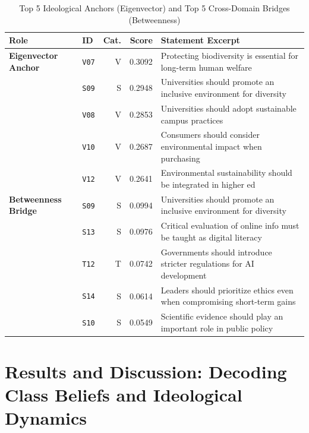 \documentclass[10pt, a4paper]{article}
\begin{document}
\begin{table}[H]
\centering
\small
\caption{Top 5 Ideological Anchors (Eigenvector) and Top 5 Cross-Domain Bridges (Betweenness)}
\label{tab:item_centrality_table}
\begin{tabular}{llrrl}
\toprule
\textbf{Role} & \textbf{ID} & \textbf{Cat.} & \textbf{Score} & \textbf{Statement Excerpt} \\
\midrule
\textbf{Eigenvector Anchor}  & \texttt{V07} & V & 0.3092 & Protecting biodiversity is essential for long-term human welfare \\
                             & \texttt{S09} & S & 0.2948 & Universities should promote an inclusive environment for diversity \\
                             & \texttt{V08} & V & 0.2853 & Universities should adopt sustainable campus practices \\
                             & \texttt{V10} & V & 0.2687 & Consumers should consider environmental impact when purchasing \\
                             & \texttt{V12} & V & 0.2641 & Environmental sustainability should be integrated in higher ed \\
\midrule
\textbf{Betweenness Bridge}  & \texttt{S09} & S & 0.0994 & Universities should promote an inclusive environment for diversity \\
                             & \texttt{S13} & S & 0.0976 & Critical evaluation of online info must be taught as digital literacy \\
                             & \texttt{T12} & T & 0.0742 & Governments should introduce stricter regulations for AI development \\
                             & \texttt{S14} & S & 0.0614 & Leaders should prioritize ethics even when compromising short-term gains \\
                             & \texttt{S10} & S & 0.0549 & Scientific evidence should play an important role in public policy \\
\bottomrule
\end{tabular}
\end{table}

\section{Results and Discussion: Decoding Class Beliefs and Ideological Dynamics}
\end{document}
